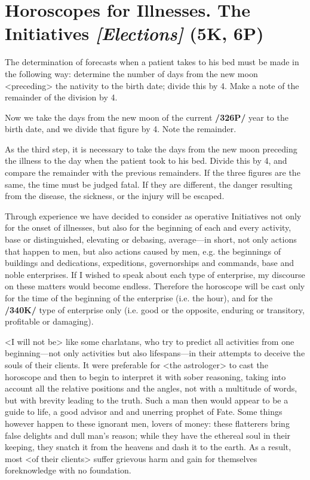 \section{Horoscopes for Illnesses. The Initiatives \textit{[Elections]} (5K, 6P)}

The determination of forecasts when a patient takes to his bed must be made in the following way: determine the number of days from the new moon <preceding> the nativity to the birth date; divide this by
4. Make a note of the remainder of the division by 4. 

Now we take the days from the new moon of the current \textbf{/326P/} year to the birth date, and we divide that figure by 4. Note the remainder. 

As the third step, it is necessary to take the days from the new moon preceding the illness to the day when the patient took to his bed. Divide this by 4, and compare the remainder with the previous remainders. If the three figures are the same, the time must be judged fatal. If they are different, the danger resulting from the disease, the sickness, or the injury will be escaped.

Through experience we have decided to consider as operative Initiatives not only for the onset of illnesses, but also for the beginning of each and every activity, base or distinguished, elevating or debasing,
average—in short, not only actions that happen to men, but also actions caused by men, e.g. the beginnings of buildings and dedications, expeditions, governorships and commands, base and noble
enterprises. If I wished to speak about each type of enterprise, my discourse on these matters would become endless. Therefore the horoscope will be cast only for the time of the beginning of the enterprise (i.e. the hour), and for the \textbf{/340K/} type of enterprise only (i.e. good or the opposite, enduring or transitory, profitable or damaging).

<I will not be> like some charlatans, who try to predict all activities from one beginning—not only activities but also lifespans—in their attempts to deceive the souls of their clients. It were preferable for
<the astrologer> to cast the horoscope and then to begin to interpret it with sober reasoning, taking into account all the relative positions and the angles, not with a multitude of words, but with brevity leading to
the truth. Such a man then would appear to be a guide to life, a good advisor and and unerring prophet of Fate. Some things however happen to these ignorant men, lovers of money: these flatterers bring false delights and dull man’s reason; while they have the ethereal soul in their keeping, they snatch it from the heavens and dash it to the earth. As a result, most <of their clients> suffer grievous harm and gain for themselves foreknowledge with no foundation.
 
\newpage